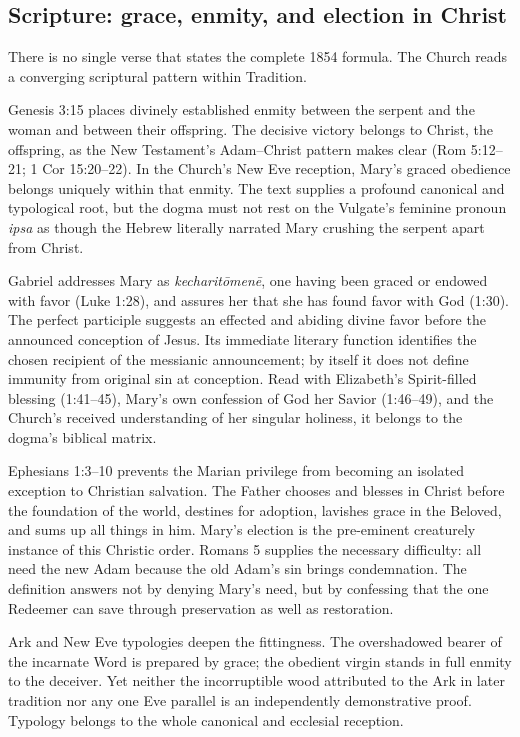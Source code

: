 \subsection{Scripture: grace, enmity, and election in Christ}

There is no single verse that states the complete 1854 formula. The Church reads a converging scriptural pattern within Tradition.

Genesis 3:15 places divinely established enmity between the serpent and the woman and between their offspring. The decisive victory belongs to Christ, the offspring, as the New Testament's Adam--Christ pattern makes clear (Rom 5:12--21; 1 Cor 15:20--22). In the Church's New Eve reception, Mary's graced obedience belongs uniquely within that enmity. The text supplies a profound canonical and typological root, but the dogma must not rest on the Vulgate's feminine pronoun \emph{ipsa} as though the Hebrew literally narrated Mary crushing the serpent apart from Christ.

Gabriel addresses Mary as \emph{kecharit\=omen\=e}, one having been graced or endowed with favor (Luke 1:28), and assures her that she has found favor with God (1:30). The perfect participle suggests an effected and abiding divine favor before the announced conception of Jesus. Its immediate literary function identifies the chosen recipient of the messianic announcement; by itself it does not define immunity from original sin at conception. Read with Elizabeth's Spirit-filled blessing (1:41--45), Mary's own confession of God her Savior (1:46--49), and the Church's received understanding of her singular holiness, it belongs to the dogma's biblical matrix.

Ephesians 1:3--10 prevents the Marian privilege from becoming an isolated exception to Christian salvation. The Father chooses and blesses in Christ before the foundation of the world, destines for adoption, lavishes grace in the Beloved, and sums up all things in him. Mary's election is the pre-eminent creaturely instance of this Christic order. Romans 5 supplies the necessary difficulty: all need the new Adam because the old Adam's sin brings condemnation. The definition answers not by denying Mary's need, but by confessing that the one Redeemer can save through preservation as well as restoration.

Ark and New Eve typologies deepen the fittingness. The overshadowed bearer of the incarnate Word is prepared by grace; the obedient virgin stands in full enmity to the deceiver. Yet neither the incorruptible wood attributed to the Ark in later tradition nor any one Eve parallel is an independently demonstrative proof. Typology belongs to the whole canonical and ecclesial reception.

